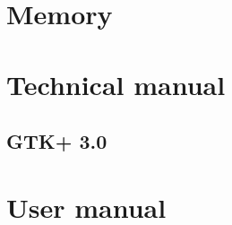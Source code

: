 \documentclass[a4paper,11pt,twoside]{book}
\begin{document}
\part{Memory}













\part{Technical manual}








\chapter{GTK+ 3.0}

\part{User manual}




\appendix







\nocite{*}


\end{document}
